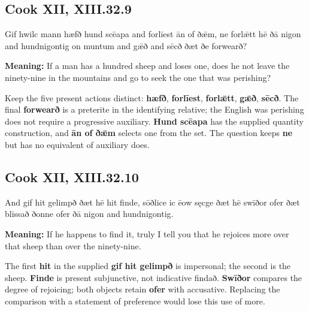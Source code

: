 \par\begin{minipage}{\linewidth}\raggedright
\subsection*{Cook XII, XIII.32.9}

Gif hwilc mann hæfð hund scēapa and forlīest ān of ðǣm, ne forlǣtt hē ðā nigon and hundnigontig on muntum and gǣð and sēcð ðæt ðe forwearð?

\textbf{Meaning:} If a man has a hundred sheep and loses one, does he not leave the ninety-nine in the mountains and go to seek the one that was perishing?

Keep the five present actions distinct: \textbf{hæfð}, \textbf{forlīest}, \textbf{forlǣtt}, \textbf{gǣð}, \textbf{sēcð}. The final \textbf{forwearð} is a preterite in the identifying relative; the English was perishing does not require a progressive auxiliary. \textbf{Hund scēapa} has the supplied quantity construction, and \textbf{ān of ðǣm} selects one from the set. The question keeps \textbf{ne} but has no equivalent of auxiliary does.

\end{minipage}\par\addvspace{4pt}

\par\begin{minipage}{\linewidth}\raggedright
\subsection*{Cook XII, XIII.32.10}

And gif hit gelimpð ðæt hē hit finde, sōðlice ic ēow sęcge ðæt hē swīðor ofer ðæt blissað ðonne ofer ðā nigon and hundnigontig.

\textbf{Meaning:} If he happens to find it, truly I tell you that he rejoices more over that sheep than over the ninety-nine.

The first \textbf{hit} in the supplied \textbf{gif hit gelimpð} is impersonal; the second is the sheep. \textbf{Finde} is present subjunctive, not indicative findað. \textbf{Swīðor} compares the degree of rejoicing; both objects retain \textbf{ofer} with accusative. Replacing the comparison with a statement of preference would lose this use of more.

\end{minipage}\par\addvspace{4pt}

